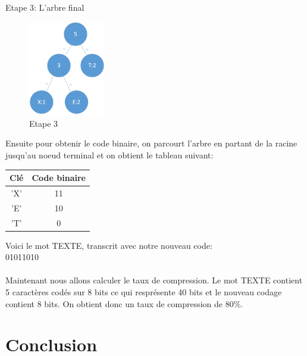 \documentclass[12pt,a4paper]{report}
\begin{document}
	Etape 3: L'arbre final
	\begin{center}
	\begin{figure}[!h]
	\centering
	\includegraphics[width=0.30\textwidth]{etape3.png}
	\caption{Etape 3}
	\end{figure}
	\end{center}
	Ensuite pour obtenir le code binaire, on parcourt l'arbre en partant de la racine jusqu'au noeud terminal et on obtient le tableau suivant:\\
	\begin{center}
	\begin{tabular}{|c|c|}
		\hline
		Clé & Code binaire\\
		\hline
		'X' & 11 \\
		'E' & 10 \\
		'T' & 0\\
		\hline
	\end{tabular}
	\end{center}
	Voici le mot TEXTE, transcrit avec notre nouveau code:\\
	01011010\\\\
	Maintenant nous allons calculer le taux de compression. Le mot TEXTE contient 5 caractères codés sur 8 bits ce qui resprésente 40 bits et le nouveau codage contient 8 bits. On obtient donc un taux de compression de 80\%.

	\chapter*{Conclusion}
	
\setcounter{tocdepth}{2}
\end{document}
